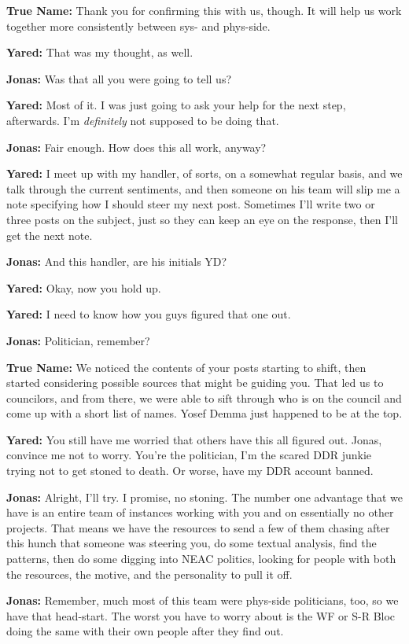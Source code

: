 \textbf{True Name:} Thank you for confirming this with us, though. It will help us work together more consistently between sys- and phys-side.

\textbf{Yared:} That was my thought, as well.

\textbf{Jonas:} Was that all you were going to tell us?

\textbf{Yared:} Most of it. I was just going to ask your help for the next step, afterwards. I'm \emph{definitely} not supposed to be doing that.

\textbf{Jonas:} Fair enough. How does this all work, anyway?

\textbf{Yared:} I meet up with my handler, of sorts, on a somewhat regular basis, and we talk through the current sentiments, and then someone on his team will slip me a note specifying how I should steer my next post. Sometimes I'll write two or three posts on the subject, just so they can keep an eye on the response, then I'll get the next note.

\textbf{Jonas:} And this handler, are his initials YD?

\textbf{Yared:} Okay, now you hold up.

\textbf{Yared:} I need to know how you guys figured that one out.

\textbf{Jonas:} Politician, remember?

\textbf{True Name:} We noticed the contents of your posts starting to shift, then started considering possible sources that might be guiding you. That led us to councilors, and from there, we were able to sift through who is on the council and come up with a short list of names. Yosef Demma just happened to be at the top.

\textbf{Yared:} You still have me worried that others have this all figured out. Jonas, convince me not to worry. You're the politician, I'm the scared DDR junkie trying not to get stoned to death. Or worse, have my DDR account banned.

\textbf{Jonas:} Alright, I'll try. I promise, no stoning. The number one advantage that we have is an entire team of instances working with you and on essentially no other projects. That means we have the resources to send a few of them chasing after this hunch that someone was steering you, do some textual analysis, find the patterns, then do some digging into NEAC politics, looking for people with both the resources, the motive, and the personality to pull it off.

\textbf{Jonas:} Remember, much most of this team were phys-side politicians, too, so we have that head-start. The worst you have to worry about is the WF or S-R Bloc doing the same with their own people after they find out.

